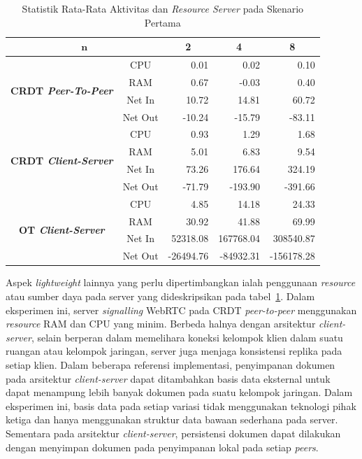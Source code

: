 \begin{table}[H]
 \centering
 \caption{Statistik Rata-Rata Aktivitas dan \textit{Resource Server} pada Skenario Pertama}
 \label{tab:resource-server-1}


\begin{tabular}{|cc|r|r|r|}
\hline
\multicolumn{2}{|c|}{$\boldsymbol{n}$} & \multicolumn{1}{c|}{\textbf{2}} & \multicolumn{1}{c|}{\textbf{4}} & \multicolumn{1}{c|}{\textbf{8}} \\ \hline
\multicolumn{1}{|c|}{\multirow{4}{*}{\textbf{CRDT \textit{Peer-To-Peer}}}} & CPU & 0.01 & 0.02 & 0.10 \\ \cline{2-5}
\multicolumn{1}{|c|}{} & RAM & 0.67 & -0.03 & 0.40 \\ \cline{2-5}
\multicolumn{1}{|c|}{} & Net In & 10.72 & 14.81 & 60.72 \\ \cline{2-5}
\multicolumn{1}{|c|}{} & Net Out & -10.24 & -15.79 & -83.11 \\ \hline
\multicolumn{1}{|c|}{\multirow{4}{*}{\textbf{CRDT \textit{Client-Server}}}} & CPU & 0.93 & 1.29 & 1.68 \\ \cline{2-5}
\multicolumn{1}{|c|}{} & RAM & 5.01 & 6.83 & 9.54 \\ \cline{2-5}
\multicolumn{1}{|c|}{} & Net In & 73.26 & 176.64 & 324.19 \\ \cline{2-5}
\multicolumn{1}{|c|}{} & Net Out & -71.79 & -193.90 & -391.66 \\ \hline
\multicolumn{1}{|c|}{\multirow{4}{*}{\textbf{OT \textit{Client-Server}}}} & CPU & 4.85 & 14.18 & 24.33 \\ \cline{2-5}
\multicolumn{1}{|c|}{} & RAM & 30.92 & 41.88 & 69.99 \\ \cline{2-5}
\multicolumn{1}{|c|}{} & Net In & 52318.08 & 167768.04 & 308540.87 \\ \cline{2-5}
\multicolumn{1}{|c|}{} & Net Out & -26494.76 & -84932.31 & -156178.28 \\ \hline
\end{tabular}
\end{table}

Aspek \textit{lightweight} lainnya yang perlu dipertimbangkan ialah penggunaan \textit{resource} atau sumber daya pada server yang dideskripsikan pada tabel~\ref{tab:resource-server-1}. Dalam eksperimen ini, server \textit{signalling} WebRTC pada CRDT \textit{peer-to-peer} menggunakan \textit{resource} RAM dan CPU yang minim. Berbeda halnya dengan arsitektur \textit{client-server}, selain berperan dalam memelihara koneksi kelompok klien dalam suatu ruangan atau kelompok jaringan, server juga menjaga konsistensi replika pada setiap klien. Dalam beberapa referensi implementasi, penyimpanan dokumen pada arsitektur \textit{client-server} dapat ditambahkan basis data eksternal untuk dapat menampung lebih banyak dokumen pada suatu kelompok jaringan. Dalam eksperimen ini, basis data pada setiap variasi tidak menggunakan teknologi pihak ketiga dan hanya menggunakan struktur data bawaan sederhana pada server. Sementara pada arsitektur \textit{client-server}, persistensi dokumen dapat dilakukan dengan menyimpan dokumen pada penyimpanan lokal pada setiap \textit{peers}.

